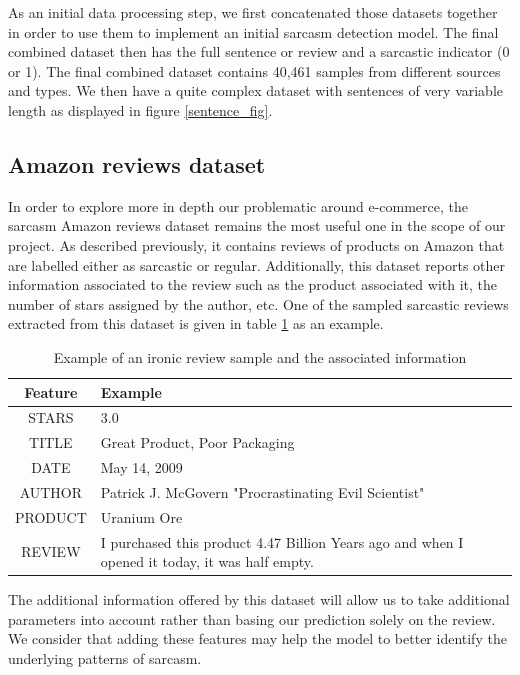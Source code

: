 \documentclass[10pt,twocolumn,letterpaper]{article}
\begin{document}
As an initial data processing step, we first concatenated those datasets together in order to use them to implement an initial sarcasm detection model. The final combined dataset then has the full sentence or review and a sarcastic indicator (0 or 1). The final combined dataset contains 40,461 samples from different sources and types. We then have a quite complex dataset with sentences of very variable length as displayed in figure \ref*{sentence_fig}.

\subsection{Amazon reviews dataset}

In order to explore more in depth our problematic around e-commerce, the sarcasm Amazon reviews dataset remains the most useful one in the scope of our project.
As described previously, it contains reviews of products on Amazon that are labelled either as sarcastic or regular. 
Additionally, this dataset reports other information associated to the review such as the product associated with it, the number of stars assigned by the author, etc. 
One of the sampled sarcastic reviews extracted from this dataset is given in table \ref*{tab:mytable} as an example.

\begin{table}[H]
\centering
\small
\begin{tabular}{|c|p{6cm}|}
\hline
\textbf{Feature} & \textbf{Example} \\
\hline
STARS & 3.0 \\
TITLE & Great Product, Poor Packaging \\
DATE & May 14, 2009 \\
AUTHOR & Patrick J. McGovern "Procrastinating Evil Scientist"\\
PRODUCT & Uranium Ore \\
REVIEW & I purchased this product 4.47 Billion Years ago and when I opened it today, it was half empty. \\
\hline

\end{tabular}
\caption{Example of an ironic review sample and the associated information}
\label{tab:mytable}
\end{table}

The additional information offered by this dataset will allow us to take additional parameters into account rather than basing our prediction solely on the review.
We consider that adding these features may help the model to better identify the underlying patterns of sarcasm.
\end{document}
